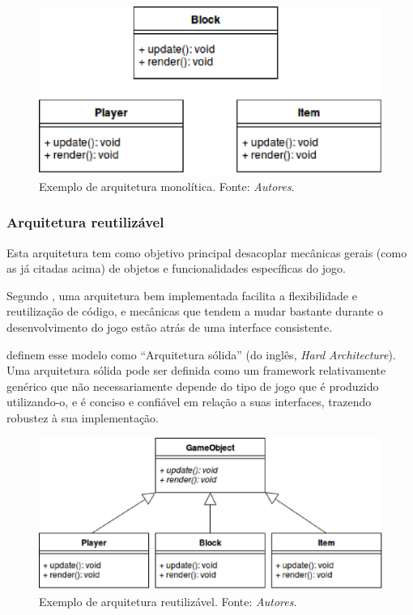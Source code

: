 \begin{figure}[H]
 \centering \includegraphics[keepaspectratio=true,scale=0.6]{figuras/monolithic-architecture.eps}
   \caption[Exemplo de arquitetura monolítica]
    {Exemplo de arquitetura monolítica. Fonte: \textit{Autores}.}
   \label{arch-monolitica}
\end{figure}

\subsubsection{Arquitetura reutilizável}

Esta arquitetura tem como objetivo principal desacoplar mecânicas gerais (como as já citadas acima) de objetos e funcionalidades específicas do jogo.

Segundo , uma arquitetura bem implementada facilita a flexibilidade e reutilização de código, e mecânicas que tendem a mudar bastante durante o desenvolvimento do jogo estão atrás de uma interface consistente.

 definem esse modelo como “Arquitetura sólida” (do inglês, \textit{Hard Architecture}). Uma arquitetura sólida pode ser definida como um framework relativamente genérico que não necessariamente depende do tipo de jogo que é produzido utilizando-o, e é conciso e confiável em relação a suas interfaces, trazendo robustez à sua implementação.

\begin{figure}[H]
 \centering \includegraphics[keepaspectratio=true,scale=0.6]{figuras/reusable-architecture.eps}
   \caption[Exemplo de arquitetura reutilizável]
    {Exemplo de arquitetura reutilizável. Fonte: \textit{Autores}.}
   \label{arch-reutilizavel}
\end{figure}

